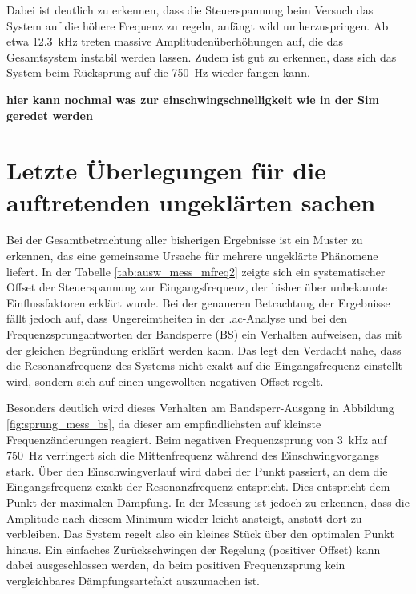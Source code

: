 \documentclass[../main_config.tex]{subfiles}
\begin{document}
Dabei ist deutlich zu erkennen, dass die Steuerspannung beim Versuch das System auf die höhere Frequenz zu regeln, anfängt wild umherzuspringen. Ab etwa \SI{12,3}{\kilo\hertz} treten massive Amplitudenüberhöhungen auf, die das Gesamtsystem instabil werden lassen. Zudem ist gut zu erkennen, dass sich das System beim Rücksprung auf die \SI{750}{\hertz} wieder fangen kann. \par
\medskip





\textbf{hier kann nochmal was zur einschwingschnelligkeit wie in der Sim geredet werden}







\section{Letzte Überlegungen für die auftretenden ungeklärten sachen}

Bei der Gesamtbetrachtung aller bisherigen Ergebnisse ist ein Muster zu erkennen, das eine gemeinsame Ursache für mehrere ungeklärte Phänomene liefert. In der Tabelle \ref{tab:ausw_mess_mfreq2} zeigte sich ein systematischer Offset der Steuerspannung zur Eingangsfrequenz, der bisher über unbekannte Einflussfaktoren erklärt wurde. Bei der genaueren Betrachtung der Ergebnisse fällt jedoch auf, dass Ungereimtheiten in der .ac-Analyse und bei den Frequenzsprungantworten der Bandsperre (BS) ein Verhalten aufweisen, das mit der gleichen Begründung erklärt werden kann. Das legt den Verdacht nahe, dass die Resonanzfrequenz des Systems nicht exakt auf die Eingangsfrequenz einstellt wird, sondern sich auf einen ungewollten negativen Offset regelt. \par
\medskip


Besonders deutlich wird dieses Verhalten am Bandsperr-Ausgang in Abbildung \ref{fig:sprung_mess_bs}, da dieser am empfindlichsten auf kleinste Frequenzänderungen reagiert. Beim negativen Frequenzsprung von \SI{3}{\kilo\hertz} auf \SI{750}{\hertz} verringert sich die Mittenfrequenz während des Einschwingvorgangs stark. Über den Einschwingverlauf wird dabei der Punkt passiert, an dem die Eingangsfrequenz exakt der Resonanzfrequenz entspricht. Dies entspricht dem Punkt der maximalen Dämpfung. In der Messung ist jedoch zu erkennen, dass die Amplitude nach diesem Minimum wieder leicht ansteigt, anstatt dort zu verbleiben. Das System regelt also ein kleines Stück über den optimalen Punkt hinaus. Ein einfaches Zurückschwingen der Regelung (positiver Offset) kann dabei ausgeschlossen werden, da beim positiven Frequenzsprung kein vergleichbares Dämpfungsartefakt auszumachen ist.\par
\medskip
\end{document}
